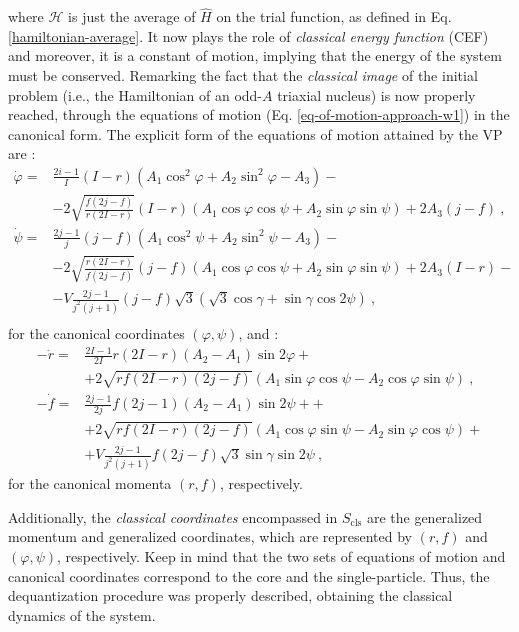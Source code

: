 where $\mathcal{H}$ is just the average of $\hat{H}$ on the trial function, as defined in Eq. \ref{hamiltonian-average}. It now plays the role of \emph{classical energy function} (CEF) and moreover, it is a constant of motion, implying that the energy of the system must be conserved. Remarking the fact that the \emph{classical image} of the initial problem (i.e., the Hamiltonian of an odd-$A$ triaxial nucleus) is now properly reached, through the equations of motion (Eq. \ref{eq-of-motion-approach-w1}) in the canonical form. The explicit form of the equations of motion attained by the VP are \cite{raduta2020approach}:
\begin{align}
    \dot{\varphi}=&\frac{2i-1}{I}(I-r)\left(A_1\cos^2\varphi+A_2\sin^2\varphi-A_3\right)-\nonumber\\
                 &-2\sqrt{\frac{f(2j-f)}{r(2I-r)}}(I-r)\left(A_1\cos\varphi\cos\psi+A_2\sin\varphi\sin\psi\right)+2A_3(j-f)\ ,\nonumber\\
    \dot{\psi}=&\frac{2j-1}{j}(j-f)\left(A_1\cos^2\psi+A_2\sin^2\psi-A_3\right)-\nonumber\\
               &-2\sqrt{\frac{r(2I-r)}{f(2j-f)}}(j-f)\left(A_1\cos\varphi\cos\psi+A_2\sin\varphi\sin\psi\right)+2A_3(I-r)-\nonumber\\
               &-V\frac{2j-1}{j^2(j+1)}(j-f)\sqrt{3}\left(\sqrt{3}\cos\gamma+\sin\gamma\cos2\psi\right)\ , \nonumber\\
    \label{eq-of-motion-explicit-coordinates}
\end{align}
for the canonical coordinates $(\varphi,\psi)$, and \cite{raduta2020approach}:
\begin{align}
    -\dot{r}=&\frac{2I-1}{2I}r(2I-r)(A_2-A_1)\sin2\varphi+\nonumber\\
             &+2\sqrt{rf(2I-r)(2j-f)}\left(A_1\sin\varphi\cos\psi-A_2\cos\varphi\sin\psi\right)\ ,\nonumber\\
    -\dot{f}=&\frac{2j-1}{2j}f(2j-1)(A_2-A_1)\sin2\psi+\nonumber+\\
             &+2\sqrt{rf(2I-r)(2j-f)}\left(A_1\cos\varphi\sin\psi-A_2\sin\varphi\cos\psi\right)+\nonumber\\
             &+V\frac{2j-1}{j^2(j+1)}f(2j-f)\sqrt{3}\sin\gamma\sin2\psi\ ,
    \label{eq-of-motion-explicit-momenta}
\end{align}
for the canonical momenta $(r,f)$, respectively.

Additionally, the \emph{classical coordinates} encompassed in $S_\text{cls}$ are the generalized momentum and generalized coordinates, which are represented by $(r,f)$ and $(\varphi,\psi)$, respectively. Keep in mind that the two sets of equations of motion and canonical coordinates correspond to the core and the single-particle. Thus, the dequantization procedure was properly described, obtaining the classical dynamics of the system.

